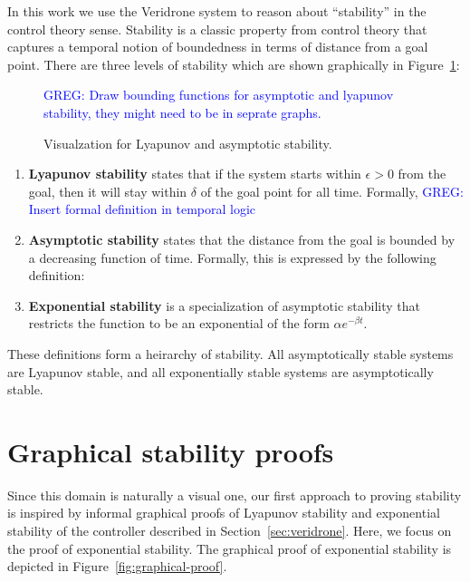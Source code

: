 \documentclass[preprint,nocopyrightspace]{sigplanconf}
\newcommand{\greg}[1]{\textcolor{blue}{\textsc{GREG}: #1}}
\begin{document}
In this work we use the Veridrone system to reason about ``stability'' in the control theory sense.
Stability is a classic property from control theory that captures a temporal notion of boundedness in terms of distance from a goal point.
There are three levels of stability which are shown graphically in Figure~\ref{fig:stability}:


\begin{figure}[!h]

  \greg{Draw bounding functions for asymptotic and lyapunov stability, they might need to be in seprate graphs.}
  

  \caption{Visualzation for Lyapunov and asymptotic stability.}
  \label{fig:stability}
\end{figure}


\begin{enumerate}
\item \textbf{Lyapunov stability} states that if the system starts within $\epsilon > 0$ from the goal, then it will stay within $\delta$ of the goal point for all time.
Formally,
\greg{Insert formal definition in temporal logic}

\item \textbf{Asymptotic stability} states that the distance from the goal is bounded by a decreasing function of time.
Formally, this is expressed by the following definition:

\item \textbf{Exponential stability} is a specialization of asymptotic stability that restricts the function to be an exponential of the form $\alpha e^{-\beta t}$.

\end{enumerate}

These definitions form a heirarchy of stability.
All asymptotically stable systems are Lyapunov stable, and all exponentially stable systems are asymptotically stable.

\section{Graphical stability proofs}
\label{sec:graphical}
Since this domain is naturally a visual one, our first approach to proving stability is inspired by informal graphical proofs of Lyapunov stability and exponential stability of the controller described in Section~\ref{sec:veridrone}.
Here, we focus on the proof of exponential stability.
The graphical proof of exponential stability is depicted in Figure~\ref{fig:graphical-proof}.
\end{document}

